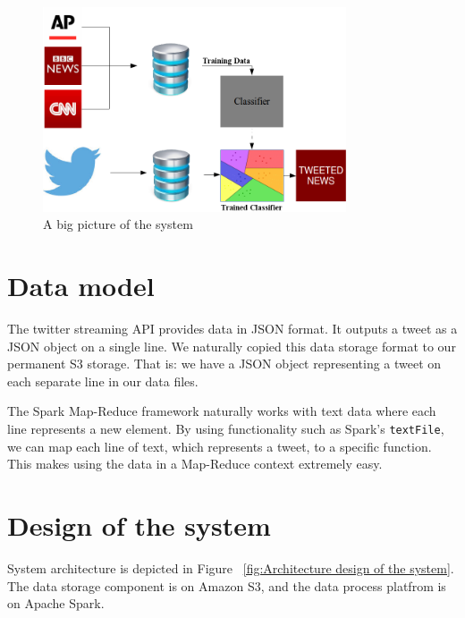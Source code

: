 \documentclass{llncs}
\begin{document}
\begin{figure}[H]
	\centering
	\includegraphics[width=0.8\textwidth]{images/bigpicture.png} 
	\caption{A big picture of the system}
	\label{fig:A big picture of the system}
\end{figure}



\section{Data model}
The twitter streaming API provides data in JSON format. It outputs a tweet as a JSON object on a single line. We naturally copied this data storage format to our permanent S3 storage. That is: we have a JSON object representing a tweet on each separate line in our data files.

The Spark Map-Reduce framework naturally works with text data where each line represents a new element. By using functionality such as Spark's \texttt{textFile}, we can map each line of text, which represents a tweet, to a specific function. This makes using the data in a Map-Reduce context extremely easy.

\section{Design of the system}
System architecture is depicted in Figure ~\ref{fig:Architecture design of the system}. The data storage component is on Amazon S3, and the data process platfrom is on Apache Spark. 
\end{document}
